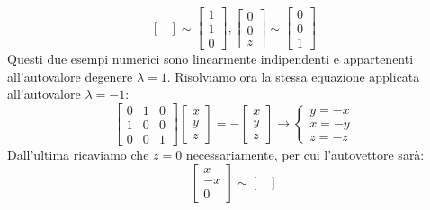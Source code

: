 \begin{exmp}
\begin{equation*}
\begin{bmatrix}
        \end{bmatrix} \sim
        \begin{bmatrix}
            1 \\ 1 \\ 0
        \end{bmatrix},
        \begin{bmatrix}
            0 \\ 0 \\ z
        \end{bmatrix} \sim
        \begin{bmatrix}
            0 \\ 0 \\ 1
        \end{bmatrix}
    \end{equation*}
    Questi due esempi numerici sono linearmente indipendenti e appartenenti all'autovalore degenere $\lambda=1$. Risolviamo ora la stessa equazione applicata all'autovalore $\lambda=-1$:
    \begin{equation*}
        \begin{bmatrix}
            0 & 1 & 0 \\
            1 & 0 & 0 \\
            0 & 0 & 1
        \end{bmatrix}
        \begin{bmatrix}
            x \\ y \\ z
        \end{bmatrix} =
        -
        \begin{bmatrix}
            x \\ y \\ z
        \end{bmatrix} \longrightarrow
        \begin{cases}
            y=-x \\
            x=-y \\
            z=-z
        \end{cases}
    \end{equation*}
    Dall'ultima ricaviamo che $z=0$ necessariamente, per cui l'autovettore sarà:
    \begin{equation*}
        \begin{bmatrix}
            x \\ -x \\ 0
        \end{bmatrix} \sim
        \begin{bmatrix}

\end{bmatrix}
\end{equation*}
\end{exmp}
